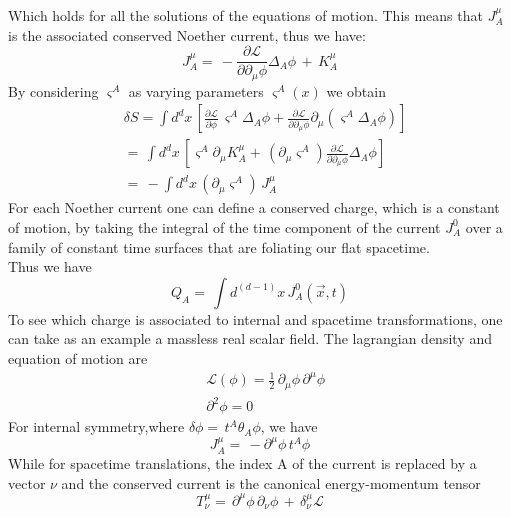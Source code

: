 \documentclass[a4paper,10pt]{article}
\begin{document}
Which holds for all the solutions of the equations of motion.
This means that $J^\mu_A$ is the associated conserved Noether current, thus we have:
\begin{equation}
 J^\mu_A=\,-\frac{\partial \mathcal{L}}{\partial \partial_\mu \phi} \Delta_A\phi \, +\, K^\mu_A
\end{equation}
By considering $\varsigma^A$ as varying parameters $\varsigma^A(x)$ we obtain
\begin{equation}
\begin{split}
  &\delta S= \int{ d^dx \,\left[ \frac{\partial \mathcal{L}}{\partial \phi}\,\varsigma^A \Delta_A\phi + \frac{\partial \mathcal{L}}{\partial \partial_\mu \phi}\partial_\mu(\varsigma^A \Delta_A\phi)\right]}\\
  &=\, \int{ d^dx \,\left[\varsigma^A \partial_\mu K^\mu_A+\,(\partial_\mu\varsigma^A) \frac{\partial \mathcal{L}}{\partial \partial_\mu \phi} \Delta_A \phi \right]}\\
  &=\, -\int{d^dx\,(\partial_\mu\varsigma^A)\,J^\mu_A}
\end{split}                        
\end{equation}
For each Noether current one can define a conserved charge, which is a constant of motion, by taking the integral of the time component of the current $J^0_A$ over a family of constant time surfaces that are foliating our flat spacetime.\\
Thus we have
\begin{equation}
 Q_A=\,\int{d^{(d-1)}x\,J^0_A(\overrightarrow{x},t)}
\end{equation}
To see which charge is associated to internal and spacetime transformations, one can take as an example a massless real scalar field. The lagrangian density and equation of motion are
\begin{equation}
 \begin{split}
  &\mathcal{L}(\phi)=\frac{1}{2}\,\partial_\mu \phi\, \partial^\mu \phi\\
  &\partial^2 \phi=0
 \end {split}
\end{equation}
For internal symmetry,where $\delta\phi=\,t^A\theta_A\phi$, we have
\begin{equation}
 J^\mu_A=\,-\partial^\mu\phi\,t^A\phi
\end{equation}
While for spacetime translations, the index A of the current is replaced by a vector $\nu$ and the conserved current is the canonical energy-momentum tensor
\begin{equation}
 T^\mu_\nu=\, \partial^\mu\phi\,\partial_\nu\phi\,+\,\delta^\mu_\nu\mathcal{L}
\end{equation}
\end{document}
